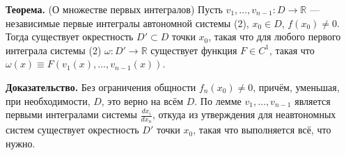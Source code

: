\QED

\textbf{Теорема.} (О множестве первых интегралов) Пусть $v_1, \dots, v_{n-1}: D \to \mathbb R$ --- независимые первые интегралы автономной системы (2), $x_0 \in D$, $f(x_0) \ne 0$.
Тогда существует окрестность $D' \subset D$ точки $x_0$, такая что для любого первого интеграла системы (2) $\omega: D' \to \mathbb R$ существует функция $F \in C^1$, такая что $\omega(x) \equiv F(v_1(x), \dots, v_{n-1}(x))$.

\textbf{Доказательство.} Без ограничения общности $f_n(x_0) \ne 0$, причём, уменьшая, при необходимости, $D$, это верно на всём $D$.
По лемме $v_1, \dots, v_{n-1}$ является первыми интегралами системы $\frac{dx_i}{dx_n}$, откуда из утверждения для неавтономных систем существует окрестность $D'$ точки $x_0$, такая что выполняется всё, что нужно.

\QED




